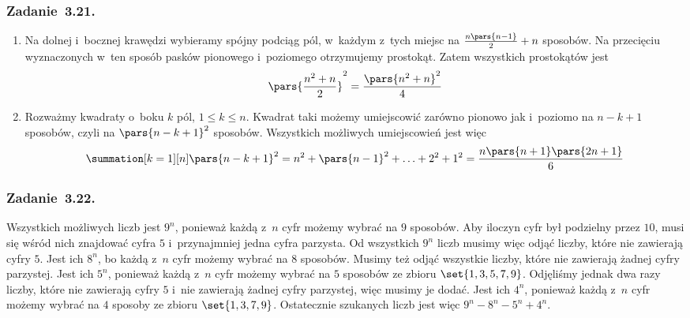 \subsubsection*{Zadanie~3.21.}
\begin{enumerate}[label={\alph*)}]
    \item Na dolnej i~bocznej krawędzi wybieramy spójny podciąg pól, w~każdym z~tych miejsc na \(\frac{n\pars{n - 1}}{2} + n\) sposobów. Na przecięciu wyznaczonych w~ten sposób pasków pionowego i~poziomego otrzymujemy prostokąt. Zatem wszystkich prostokątów jest
        \begin{equation*}
            \pars{\frac{n^2 + n}{2}}^2
                = \frac{\pars{n^2 + n}^2}{4}
        \end{equation*}
    \item Rozważmy kwadraty o~boku \(k\) pól, \(1 \leq k \leq n\). Kwadrat taki możemy umiejscowić zarówno pionowo jak i~poziomo na \(n - k + 1\) sposobów, czyli na \(\pars{n - k + 1}^2\) sposobów. Wszystkich możliwych umiejscowień jest więc
        \begin{equation*}
            \summation[k = 1][n] \pars{n - k + 1}^2
                = n^2 + \pars{n - 1}^2 + \ldots + 2^2 + 1^2
                = \frac{n\pars{n + 1}\pars{2n + 1}}{6}
        \end{equation*}
\end{enumerate}
\subsubsection*{Zadanie~3.22.}
Wszystkich możliwych liczb jest \(9^n\), ponieważ każdą z~\(n\) cyfr możemy wybrać na \(9\) sposobów. Aby iloczyn cyfr był podzielny przez \(10\), musi się wśród nich znajdować cyfra \(5\) i~przynajmniej jedna cyfra parzysta. Od wszystkich \(9^n\) liczb musimy więc odjąć liczby, które nie zawierają cyfry \(5\). Jest ich \(8^n\), bo każdą z~\(n\) cyfr możemy wybrać na \(8\) sposobów. Musimy też odjąć wszystkie liczby, które nie zawierają żadnej cyfry parzystej. Jest ich \(5^n\), ponieważ każdą z~\(n\) cyfr możemy wybrać na \(5\) sposobów ze zbioru \(\set{1, 3, 5, 7, 9}\). Odjęliśmy jednak dwa razy liczby, które nie zawierają cyfry \(5\) i~nie zawierają żadnej cyfry parzystej, więc musimy je dodać. Jest ich \(4^n\), ponieważ każdą z~\(n\) cyfr możemy wybrać na \(4\) sposoby ze zbioru \(\set{1, 3, 7, 9}\). Ostatecznie szukanych liczb jest więc \(9^n - 8^n - 5^n + 4^n\).
